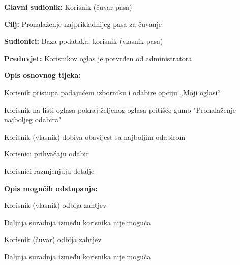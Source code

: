 					\noindent {}
					\begin{packed_item}
						
						\item \textbf{Glavni sudionik: } Korisnik (čuvar pasa)
						\item  \textbf{Cilj:} Pronalaženje najprikladnijeg pasa za čuvanje
						\item  \textbf{Sudionici:} Baza podataka, korisnik (vlasnik pasa)
						\item  \textbf{Preduvjet:} Korisnikov oglas je potvrđen od administratora
						\item  \textbf{Opis osnovnog tijeka:}
						
						\item[] \begin{packed_enum}
							
							\item Korisnik pristupa padajućem izborniku i odabire opciju „Moji oglasi“    
							\item Korisnik na listi oglasa pokraj željenog oglasa pritišće gumb "Pronalaženje najboljeg odabira"  
							\item Korisnik (vlasnik) dobiva obavijest sa najboljim odabirom
							\item Korisnici prihvaćaju odabir
							\item Korisnici razmjenjuju detalje
							
						\end{packed_enum}
						
						\item  \textbf{Opis mogućih odstupanja:}
						
						\item[] \begin{packed_item}
							
							\item[4.a] Korisnik (vlasnik) odbija zahtjev
							\item[] \begin{packed_enum}
								
								\item Daljnja suradnja između korisnika nije moguća
								
							\end{packed_enum}
							\item[4.b] Korisnik (čuvar) odbija zahtjev
							\item[] \begin{packed_enum}
								
								\item Daljnja suradnja između korisnika nije moguća
								
							\end{packed_enum}
						\end{packed_item}
					\end{packed_item}	
				
